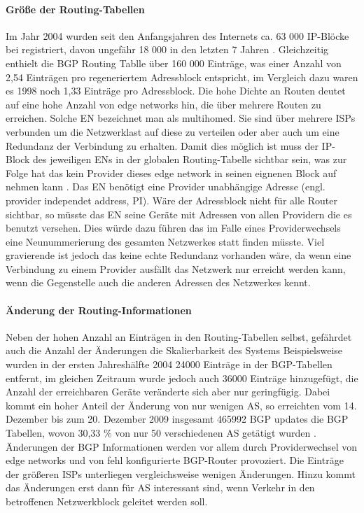 \paragraph{Größe der Routing-Tabellen}
Im Jahr 2004 wurden seit den Anfangsjahren des Internets ca. 63 000 IP-Blöcke bei registriert, davon ungefähr 18 000 in den letzten 7 Jahren \cite{journals/ccr/MengXZHLZ04}. Gleichzeitig enthielt die BGP Routing Tablle über 160 000 Einträge, was einer Anzahl von 2,54 Einträgen pro regeneriertem Adressblock entspricht, im Vergleich dazu waren es 1998 noch 1,33 Einträge pro Adressblock. Die hohe Dichte an Routen deutet auf eine hohe Anzahl von edge networks hin, die über mehrere Routen zu erreichen. Solche EN bezeichnet man als multihomed. Sie sind über mehrere ISPs verbunden um die Netzwerklast auf diese zu verteilen oder aber auch um eine Redundanz der Verbindung zu erhalten. Damit dies möglich ist muss der IP-Block des jeweiligen ENs in der globalen Routing-Tabelle sichtbar sein, was zur Folge hat das kein Provider dieses edge network in seinen eignenen Block auf nehmen kann \cite{jen:2008:start}. Das EN benötigt eine Provider unabhängige Adresse (engl. provider independet address, PI). Wäre der Adressblock nicht für alle Router sichtbar, so müsste das EN seine Geräte mit Adressen von allen Providern die es benutzt versehen. Dies würde dazu führen das im Falle eines Providerwechsels eine Neunummerierung des gesamten Netzwerkes statt finden müsste. Viel gravierende ist jedoch das keine echte Redundanz vorhanden wäre, da wenn eine Verbindung zu einem Provider ausfällt das Netzwerk nur erreicht werden kann, wenn die Gegenstelle auch die anderen Adressen des Netzwerkes kennt.

\paragraph{Änderung der Routing-Informationen} 
Neben der hohen Anzahl an Einträgen in den Routing-Tabellen selbst, gefährdet auch die Anzahl der Änderungen die Skalierbarkeit des Systems Beispielsweise wurden in der ersten Jahreshälfte 2004 24000 Einträge in der BGP-Tabellen entfernt, im gleichen Zeitraum wurde jedoch auch 36000 Einträge hinzugefügt, die Anzahl der erreichbaren Geräte veränderte sich aber nur geringfügig. Dabei kommt ein hoher Anteil der Änderung von nur wenigen AS, so erreichten vom 14. Dezember bis zum 20. Dezember 2009 insgesamt 465992 BGP updates die BGP Tabellen, wovon 30,33 \% von nur 50 verschiedenen AS getätigt wurden \cite{Huston:aktuell:BGP}. Änderungen der BGP Informationen werden vor allem durch Providerwechsel von edge networks und von fehl konfigurierte BGP-Router provoziert. Die Einträge der größeren ISPs unterliegen vergleichsweise wenigen Änderungen. Hinzu kommt das Änderungen erst dann für AS interessant sind, wenn Verkehr in den betroffenen Netzwerkblock geleitet werden soll.


